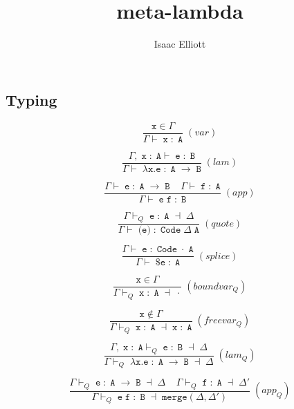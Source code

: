\documentclass{article}
\title{meta-lambda}
\author{Isaac Elliott}
\begin{document}
\maketitle

\subsection{Typing}

$$
\frac
  {\texttt{x} \in \Gamma}
  {\Gamma \vdash \; \texttt{x} \; : \; \texttt{A} }
  \; (var)
$$

$$
\frac
  {\Gamma, \; \texttt{x} \; : \; \texttt{A} \vdash \; \texttt{e} \; : \; \texttt{B}}
  {\Gamma \vdash \; \lambda \texttt{x.} \texttt{e} \; : \; \texttt{A} \; \rightarrow \; \texttt{B}}
  \; (lam)
$$

$$
\frac
  {
    \Gamma \vdash \; \texttt{e} \; : \; \texttt{A} \; \rightarrow \; \texttt{B}
    \; \; \; \;
    \Gamma \vdash \; \texttt{f} \; : \; \texttt{A}
  }
  {\Gamma \vdash \; \texttt{e} \; \texttt{f} \; : \; \texttt{B}}
  \; (app)
$$

$$
\frac
  {\Gamma \vdash_{Q} \; \texttt{e} \; : \; \texttt{A} \; \dashv \; \Delta}
  {\Gamma \vdash \; \texttt{\`(e)} \; : \; \texttt{Code} \; \Delta \; \texttt{A}}
  \; (quote)
$$

$$
\frac
  {\Gamma \vdash \; \texttt{e} \; : \; \texttt{Code} \; \cdot \; \texttt{A}}
  {\Gamma \vdash \; \texttt{\$} \texttt{e} \; : \; \texttt{A}}
  \; (splice)
$$

$$
\frac
  {\texttt{x} \in \Gamma}
  {\Gamma \vdash_{Q} \; \texttt{x} \; : \; \texttt{A} \; \dashv \; \cdot}
  \; (boundvar_Q)
$$

$$
\frac
  {\texttt{x} \notin \Gamma}
  {\Gamma \vdash_{Q} \; \texttt{x} \; : \; \texttt{A} \; \dashv \; \texttt{x} \; : \; \texttt{A}}
  \; (freevar_Q)
$$

$$
\frac
    {\Gamma, \; \texttt{x} \; : \; \texttt{A} \vdash_{Q} \; \texttt{e} \; : \; \texttt{B} \; \dashv \; \Delta}
    {\Gamma \vdash_{Q} \; \lambda \texttt{x.} \texttt{e} \; : \; \texttt{A} \; \rightarrow \; \texttt{B} \; \dashv \; \Delta}
    \; (lam_Q)
$$

$$
\frac
    {
      \Gamma \vdash_{Q} \; \texttt{e} \; : \; \texttt{A} \; \rightarrow \; \texttt{B} \; \dashv \; \Delta
      \; \; \; \;
      \Gamma \vdash_{Q} \; \texttt{f} \; : \; \texttt{A} \; \dashv \; \Delta'
    }
    {\Gamma \vdash_{Q} \; \texttt{e} \; \texttt{f} \; : \; \texttt{B} \; \dashv \; \texttt{merge}(\Delta, \Delta')}
    \; (app_Q)
$$
\end{document}
